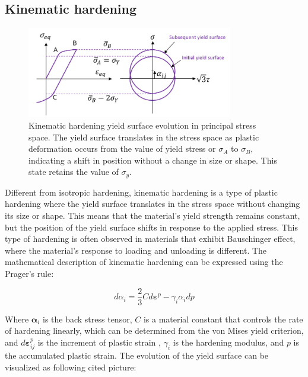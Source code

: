 \documentclass[12pt]{article}
\begin{document}
\subsection{Kinematic hardening}
\begin{figure}[H]
    \centering
    \includegraphics[width=0.8\textwidth]{images/Kinematic_Hardening.png}
    \caption{Kinematic hardening yield surface evolution in principal stress space. 
    The yield surface translates in the stress space as plastic deformation occurs from the 
    value of yield stress or $\sigma_{A}$ to
    $\sigma_{B}$, 
    indicating a shift in position without a change in size or shape. This state retains the
    value of $\sigma_y$. \cite{jahed2021cyclic}}
    \label{fig:kinematic_hardening}
\end{figure}
\hspace{2em}Different from isotropic hardening, kinematic hardening is a type of plastic hardening
where the yield surface translates in the stress space without changing its size or shape. This means that
the material's yield strength remains constant, but the position of the yield surface shifts in response
to the applied stress. This type of hardening is often observed in materials that exhibit
Bauschinger effect, where the material's response to loading and unloading is different. The mathematical
description of kinematic hardening can be expressed using the Prager's rule:

\begin{equation}
    d \alpha_{i} = \frac{2}{3}C d \boldsymbol{\varepsilon}^{p} - \gamma_{i} \alpha_{i} dp
\end{equation}

Where $\boldsymbol{\alpha}_{i}$ is the back stress tensor, $C$ is a material constant that controls 
the rate of hardening linearly, which can be determined from the von Mises yield criterion, and $d \boldsymbol{\varepsilon}_{ij}^{p}$ 
is the increment of plastic strain \cite{jahed2021cyclic}, $\gamma_{i}$ is the hardening modulus, 
and $p$ is the accumulated plastic strain. The evolution of the yield surface can be visualized
as following cited picture:
\end{document}
